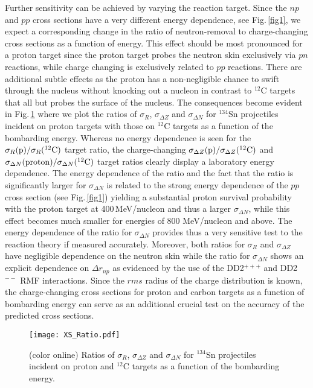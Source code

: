\documentclass[english,aps,prl,twocolumn,superscriptaddress]{revtex4}
\begin{document}
Further sensitivity can be achieved by varying the reaction target. Since the $np$ and $pp$ cross sections have a very different energy dependence, see Fig.\,\ref{fig1}, we expect a corresponding change in the ratio of neutron-removal to charge-changing cross sections as a function of energy. This effect should be most pronounced for a proton target since the proton target probes the neutron skin exclusively via $pn$ reactions, while charge changing is exclusively related to $pp$ reactions. There are additional subtle effects as the proton has a non-negligible chance to swift through the nucleus without knocking out a nucleon in contrast to $^{12}$C targets that all but probes the surface of the nucleus. The consequences become evident in Fig.\,\ref{fig4} where we plot the ratios of $\sigma_R$, $\sigma_{\Delta Z}$ and $\sigma_{\Delta N}$ for $^{134}$Sn projectiles incident on proton targets with those on $^{12}$C targets as a function of the bombarding energy. Whereas no energy dependence is seen for  the $\sigma_R({\rm p})/\sigma_R(^{12}{\rm C})$ target ratio, the charge-changing $\sigma_{\Delta Z}({\rm p})/\sigma_{\Delta Z}(^{12}{\rm C})$ and $\sigma_{\Delta N}({\rm proton})/\sigma_{\Delta N}(^{12}{\rm C})$ target ratios clearly display a laboratory energy dependence. The energy dependence of the ratio and the fact that the ratio is significantly larger for $\sigma_{\Delta N}$ is related to the strong energy dependence of the $pp$ cross section (see Fig.\,\ref{fig1}) yielding a substantial proton survival probability with the proton target at 400\,MeV/nucleon and thus a larger $\sigma_{\Delta N}$, while this effect becomes much smaller for energies of 800 MeV/nucleon and above. The energy dependence of the ratio for $\sigma_{\Delta N}$ provides thus a very sensitive test to the reaction theory if measured accurately. Moreover, both ratios  for $\sigma_R$ and $\sigma_{\Delta Z}$ have negligible dependence on the neutron skin while the ratio for $\sigma_{\Delta N}$ shows an explicit dependence on $\Delta r_{np}$ as evidenced by the use of the DD2$^{+++}$ and DD2$^{--}$ RMF interactions. Since the $rms$ radius of the charge distribution is known, the charge-changing cross sections for proton and carbon targets as a function of bombarding energy can serve as an additional crucial test on the accuracy of the predicted cross sections. 

\begin{figure}[t]
\texttt{[image: XS\_Ratio.pdf]}
\caption{(color online) Ratios of $\sigma_R$, $\sigma_{\Delta Z}$ and $\sigma_{\Delta N}$ for $^{134}$Sn projectiles incident on proton and $^{12}$C targets as a function of the bombarding energy.}
\label{fig4}
\end{figure}
\end{document}
